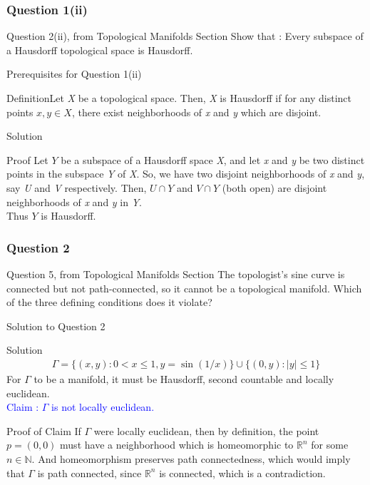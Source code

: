 \documentclass{beamer}
\begin{document}
\begin{frame}
\frametitle{Question 1(ii)}
\begin{block}{Question 2(ii), from Topological Manifolds Section}
Show that : Every subspace of a Hausdorff topological space is Hausdorff.
\end{block}

\end{frame}
\begin{frame}{Prerequisites for Question 1(ii)}
 \begin{block}{Definition}Let \textit{X} be a topological space. Then, \textit{X} is Hausdorff if for any distinct points $x, y \in X$, there exist neighborhoods of \textit{x} and \textit{y} which are disjoint.
 \end{block} 
 \end{frame}
 
 \begin{frame}{Solution}
 \begin{block}{Proof}
 Let $Y$ be a subspace of a Hausdorff space \textit{X}, and let \textit{x} and \textit{y} be two distinct points in the subspace \textit{Y} of \textit{X}. So, we have two disjoint neighborhoods of \textit{x} and \textit{y}, say \textit{U} and \textit{V} respectively. Then, $U \cap Y$ and $V \cap Y$ (both open) are disjoint neighborhoods of \textit{x} and \textit{y} in \textit{Y}. \\
Thus $Y$ is Hausdorff. \qedsymbol
 \end{block}

\end{frame}
\begin{frame}
\frametitle{Question 2}
\begin{block}{Question 5, from Topological Manifolds Section}
The topologist’s sine curve is connected but not path-connected, so it cannot be a topological manifold. Which of the three defining conditions does it violate?
\end{block}
\end{frame}


\begin{frame}{Solution to Question 2}

\begin{block}{Solution}
\begin{align*}
 \Gamma = \{(x, y) : 0 < x \leq 1, y = \sin(1/x)\} \cup \{(0, y) : |y| \leq 1\}
\end{align*}
For $\Gamma$ to be a manifold, it must be Hausdorff, second countable and locally euclidean.\\
\textcolor{blue}{Claim : $\Gamma$ is not locally euclidean.}
\end{block}

\begin{block}{Proof of Claim}
If $\Gamma$ were locally euclidean, then by definition, the point $p=(0,0)$ must have a neighborhood which is homeomorphic to $\mathbb{R}^n$ for some $n \in \mathbb{N}$. And homeomorphism preserves path connectedness, which would imply that $\Gamma$ is path connected, since $\mathbb{R}^n$ is connected, which is a contradiction.
\end{block}
\end{frame}
\end{document}
